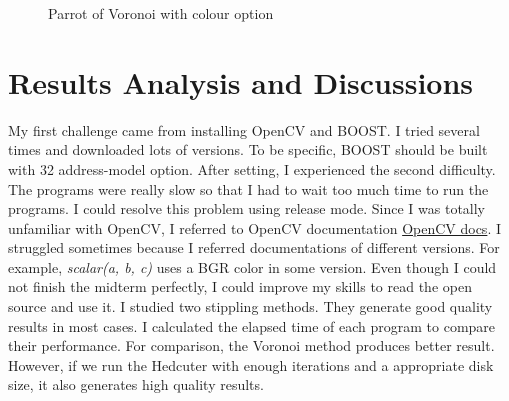 \documentclass[11pt]{article}
\begin{document}
	\begin{figure}[ht] 
	\begin{center} 
	\hspace{5mm}
	\caption{Parrot of Voronoi with colour option} 
	\label{fig:parrotcvoronoi}
	\end{center} 
	\end{figure}
\clearpage


\section{Results Analysis and Discussions}
My first challenge came from installing OpenCV and BOOST. I tried several times and downloaded lots of versions. To be specific, BOOST should be built with 32 address-model option. After setting, I experienced the second difficulty. The programs were really slow so that I had to wait too much time to run the programs. I could resolve this problem using release mode. Since I was totally unfamiliar with OpenCV, I referred to OpenCV documentation \href{http://docs.opencv.org/}{OpenCV docs}.  I struggled sometimes because I referred documentations of different versions. For example, \textit{scalar(a, b, c)} uses a BGR color in some version. Even though I could not finish the midterm perfectly, I could improve my skills to read the open source and use it. I studied two stippling methods. They generate good quality results in most cases. I calculated the elapsed time of each program to compare their performance. For comparison, the Voronoi method produces better result. However, if we run the Hedcuter with enough iterations and a appropriate disk size, it also generates high quality results. 


\end{document}
